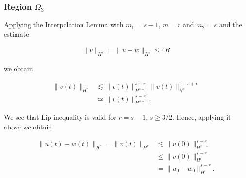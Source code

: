 \documentclass[handout]{beamer}
\numberwithin{equation}{section}
\begin{document}
\begin{frame}
\frametitle{Region $\Omega_{3}$} 


Applying the Interpolation Lemma with $m_{1} = s-1$, $m =r$ and $m_{2} = s$ and
the estimate


\begin{equation*}
\begin{split}
  \|v\|_{H^{s}} = \|u - w \|_{H^{s}} \le 4R
\end{split}
\end{equation*}


we obtain


\begin{equation*}
  \label{pre-lip-ap}
\begin{split}
  \| v(t) \|_{H^{r}} & \lesssim \| v(t) \|_{H^{s-1}}^{s-r} \|v(t) \|_{H^{s}}^{1-s+r}
  \\
  & \simeq \| v(t) \|_{H^{s-1}}^{s-r}.
\end{split}
\end{equation*}


We see that Lip inequality is valid for  $r = s-1$, $s \ge 3/2$. Hence,
applying it above we obtain 


\begin{equation*}
\begin{split}
    \|u(t) - w(t) \|_{H^{r}} = \| v(t) \|_{H^{r}} & \lesssim \|v(0) \|_{H^{s-1}}^{s-r}
   \\
   & \le \|v(0) \|_{H^{r}}^{s-r} 
  \\
  & = \|u_{0} - w_{0}\|_{H^{r}}^{s-r}.
\end{split}
\end{equation*}

\end{frame}













\end{document}
